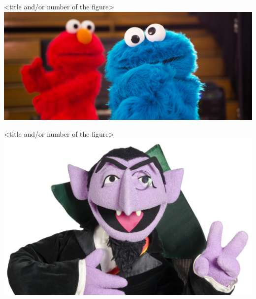 \begin{frame}[t]
\begin{columns}
\begin{column}{\hsize}

\begin{mpiblock}[Results][altBackgroundColour]
 
    \begin{multicols}{2}
    
      \lipsum[7]
    
      \lipsum[8]
    
      \begin{mpifig}{<title and/or number of the figure>}
          \includegraphics[width=\columnwidth]{./graph/cookie.jpg}
      \end{mpifig}
    
    \end{multicols}

    \begin{multicols}{3}  
      
      \lipsum[8]
      
      \begin{mpifig}{<title and/or number of the figure>}
        \includegraphics[width=\columnwidth]{./graph/count.jpg}
      \end{mpifig}


\end{multicols}
\end{mpiblock}
\end{column}
\end{columns}
\end{frame}
